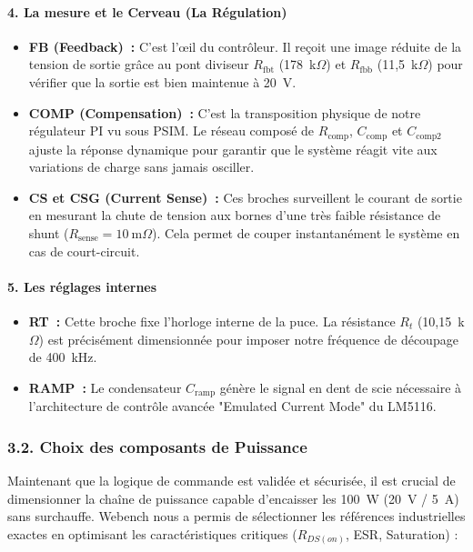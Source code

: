 \paragraph{4. La mesure et le Cerveau (La Régulation)}
\begin{itemize}
    \item \textbf{FB (Feedback)~:} C'est l'œil du contrôleur. Il reçoit une image réduite de la tension de sortie grâce au pont diviseur $R_{\text{fbt}}$ (178~k$\Omega$) et $R_{\text{fbb}}$ (11,5~k$\Omega$) pour vérifier que la sortie est bien maintenue à 20~V.
    \item \textbf{COMP (Compensation)~:} C’est la transposition physique de notre régulateur PI vu sous PSIM. Le réseau composé de $R_{\text{comp}}$, $C_{\text{comp}}$ et $C_{\text{comp2}}$ ajuste la réponse dynamique pour garantir que le système réagit vite aux variations de charge sans jamais osciller.
    \item \textbf{CS et CSG (Current Sense)~:} Ces broches surveillent le courant de sortie en mesurant la chute de tension aux bornes d'une très faible résistance de shunt ($R_{\text{sense}} = 10~\text{m}\Omega$). Cela permet de couper instantanément le système en cas de court-circuit.
\end{itemize}

\paragraph{5. Les réglages internes}
\begin{itemize}
    \item \textbf{RT~:} Cette broche fixe l'horloge interne de la puce. La résistance $R_t$ (10,15~k$\Omega$) est précisément dimensionnée pour imposer notre fréquence de découpage de 400~kHz.
    \item \textbf{RAMP~:} Le condensateur $C_{\text{ramp}}$ génère le signal en dent de scie nécessaire à l'architecture de contrôle avancée "Emulated Current Mode" du LM5116.
\end{itemize}

\subsubsection*{3.2. Choix des composants de Puissance}
Maintenant que la logique de commande est validée et sécurisée, il est crucial de dimensionner la chaîne de puissance capable d'encaisser les 100~W (20~V / 5~A) sans surchauffe. Webench nous a permis de sélectionner les références industrielles exactes en optimisant les caractéristiques critiques ($R_{DS(on)}$, ESR, Saturation) :

